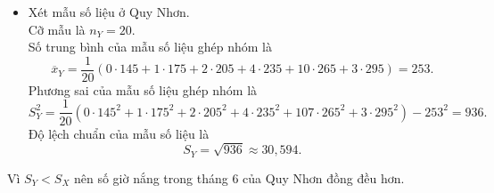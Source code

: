 \begin{bt}
{\begin{itemize}
			\item Xét mẫu số liệu ở Quy Nhơn.\\
			Cỡ mẫu là $n_Y=20$.\\
			Số trung bình của mẫu số liệu ghép nhóm là 
			$$\overline{x}_Y=\dfrac{1}{20}\left(0\cdot 145+1\cdot 175+2\cdot 205+4\cdot 235+10\cdot 265+3\cdot 295\right)=253.$$
			Phương sai của mẫu số liệu ghép nhóm là
			$$S^2_Y=\dfrac{1}{20}\left(0\cdot 145^2+1\cdot 175^2+2\cdot 205^2+4\cdot 235^2+107\cdot 265^2+3\cdot 295^2\right)-253^2=936.$$
			Độ lệch chuẩn của mẫu số liệu là 
			$$S_Y=\sqrt{936}\approx 30{,}594.$$
		\end{itemize}
		Vì $S_Y<S_X$ nên số giờ nắng trong tháng 6 của Quy Nhơn đồng đều hơn.
	}
\end{bt}

